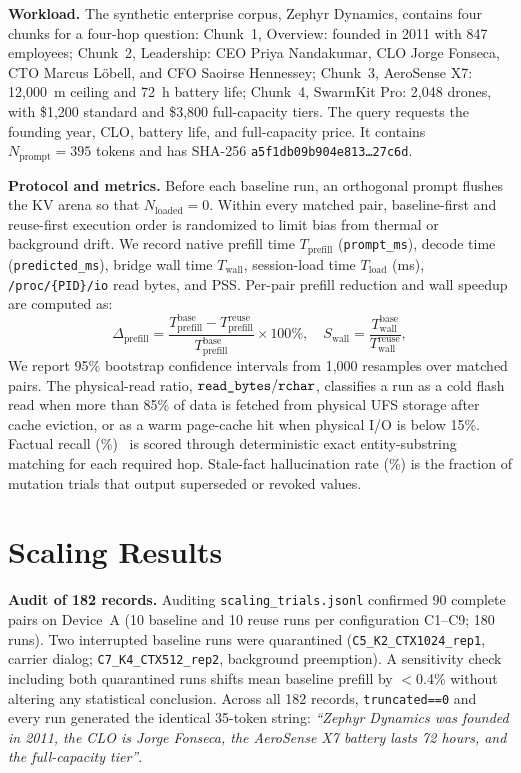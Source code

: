 \documentclass[10pt,conference]{IEEEtran}
\newcommand{\us}{\_\allowbreak}
\begin{document}
\textbf{Workload.} The synthetic enterprise corpus, Zephyr Dynamics, contains four chunks for a four-hop question:
Chunk~1, Overview: founded in 2011 with 847 employees;
Chunk~2, Leadership: CEO Priya Nandakumar, CLO Jorge Fonseca, CTO Marcus L{\"o}bell, and CFO Saoirse Hennessey;
Chunk~3, AeroSense X7: 12,000~m ceiling and 72~h battery life;
Chunk~4, SwarmKit Pro: 2,048 drones, with \$1,200 standard and \$3,800 full-capacity tiers.
The query requests the founding year, CLO, battery life, and full-capacity price. It contains $N_{\text{prompt}}=395$ tokens and has SHA-256 \texttt{a5f1db09b904e813\ldots27c6d}.

\textbf{Protocol and metrics.} Before each baseline run, an orthogonal prompt flushes the KV arena so that $N_{\text{loaded}}=0$. Within every matched pair, baseline-first and reuse-first execution order is randomized to limit bias from thermal or background drift. We record native prefill time $T_{\text{prefill}}$ (\texttt{prompt\us ms}), decode time (\texttt{predicted\us ms}), bridge wall time $T_{\text{wall}}$, session-load time $T_{\text{load}}$ (ms), \texttt{/proc/\allowbreak\{PID\}/\allowbreak io} read bytes, and PSS.
Per-pair prefill reduction and wall speedup are computed as:
\begin{equation}
\Delta_{\text{prefill}}=\frac{T^{\text{base}}_{\text{prefill}}-T^{\text{reuse}}_{\text{prefill}}}{T^{\text{base}}_{\text{prefill}}}\times100\%,\quad
S_{\text{wall}}=\frac{T^{\text{base}}_{\text{wall}}}{T^{\text{reuse}}_{\text{wall}}},
\end{equation}
We report 95\% bootstrap confidence intervals from 1,000 resamples over matched pairs. The physical-read ratio, $\text{\texttt{read\_bytes}}/\text{\texttt{rchar}}$, classifies a run as a cold flash read when more than 85\% of data is fetched from physical UFS storage after cache eviction, or as a warm page-cache hit when physical I/O is below 15\%. Factual recall (\%)~\cite{min2023factscore} is scored through deterministic exact entity-substring matching for each required hop. Stale-fact hallucination rate (\%) is the fraction of mutation trials that output superseded or revoked values.

\section{Scaling Results}
\label{sec:results_scaling}

\textbf{Audit of 182 records.} Auditing \texttt{scaling\us trials.jsonl} confirmed 90 complete pairs on Device~A (10 baseline and 10 reuse runs per configuration C1--C9; 180 runs). Two interrupted baseline runs were quarantined (\texttt{C5\us K2\us CTX1024\us rep1}, carrier dialog; \texttt{C7\us K4\us CTX512\us rep2}, background preemption). A sensitivity check including both quarantined runs shifts mean baseline prefill by $<$0.4\% without altering any statistical conclusion. Across all 182 records, \texttt{truncated==0} and every run generated the identical 35-token string: \emph{``Zephyr Dynamics was founded in 2011, the CLO is Jorge Fonseca, the AeroSense X7 battery lasts 72 hours, and the full-capacity tier''}.
\end{document}
